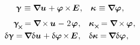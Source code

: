 \nopagebreak\vspace{-0.1em}
\begin{equation}\label{deformationtensors:micropolarcontinuum}
\begin{array}{rl}
\distortiontensor \hspace{.16ex} \equiv \boldnabla \fieldofdisplacements \hspace{.1ex} + \fieldofrotations \hspace{-0.12ex} \times \hspace{-0.2ex} \UnitDyad \hspace{.1ex} , &
\wrynesstensor \hspace{.16ex} \equiv \boldnabla \fieldofrotations
\hspace{.1ex} ,
\end{array}
\end{equation}
%
\nopagebreak\vspace{-0.85em}
\begin{equation*}
\begin{array}{rl}
\distortiontensor_{\hspace{-0.25ex}\Xcompanion} \hspace{-0.16ex}
= \boldnabla \hspace{-0.16ex} \times \hspace{-0.1ex} \fieldofdisplacements \hspace{.12ex} - \hspace{.12ex} 2 \hspace{.16ex} \fieldofrotations \hspace{.1ex}
, &
\wrynesstensor_{\hspace{.1ex}\Xcompanion} \hspace{-0.16ex}
= \boldnabla \hspace{-0.16ex} \times \hspace{-0.1ex} \fieldofrotations \hspace{.1ex} ,
\\[.3em]
%
\variation{\distortiontensor}
= \hspace{-0.16ex} \boldnabla \variation{\fieldofdisplacements} \hspace{.1ex}
+ \variation{\fieldofrotations} \hspace{-0.2ex} \times \hspace{-0.2ex} \UnitDyad \hspace{.1ex}
, &
\variation{\wrynesstensor} = \hspace{-0.16ex} \boldnabla \variation{\fieldofrotations} \hspace{.1ex} ,
\end{array}
\end{equation*}

